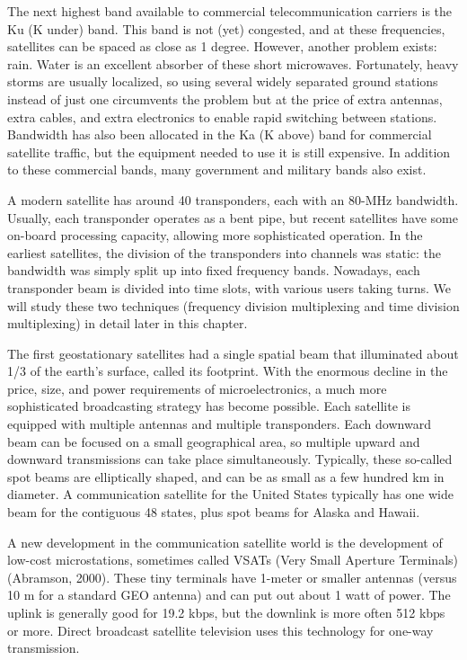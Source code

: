 The next highest band available to commercial telecommunication carriers
is the Ku (K under) band. This band is not (yet) congested, and at these
frequencies, satellites can be spaced as close as 1 degree. However,
another problem exists: rain. Water is an excellent absorber of these
short microwaves. Fortunately, heavy storms are usually localized, so
using several widely separated ground stations instead of just one
circumvents the problem but at the price of extra antennas, extra
cables, and extra electronics to enable rapid switching between
stations. Bandwidth has also been allocated in the Ka (K above) band for
commercial satellite traffic, but the equipment needed to use it is
still expensive. In addition to these commercial bands, many government
and military bands also exist.

A modern satellite has around 40 transponders, each with an 80-MHz
bandwidth. Usually, each transponder operates as a bent pipe, but recent
satellites have some on-board processing capacity, allowing more
sophisticated operation. In the earliest satellites, the division of the
transponders into channels was static: the bandwidth was simply split up
into fixed frequency bands. Nowadays, each transponder beam is divided
into time slots, with various users taking turns. We will study these
two techniques (frequency division multiplexing and time division
multiplexing) in detail later in this chapter.

The first geostationary satellites had a single spatial beam that
illuminated about 1/3 of the earth's surface, called its {footprint}.
With the enormous decline in the price, size, and power requirements of
microelectronics, a much more sophisticated broadcasting strategy has
become possible. Each satellite is equipped with multiple antennas and
multiple transponders. Each downward beam can be focused on a small
geographical area, so multiple upward and downward transmissions can
take place simultaneously. Typically, these so-called {spot beams} are
elliptically shaped, and can be as small as a few hundred km in
diameter. A communication satellite for the United States typically has
one wide beam for the contiguous 48 states, plus spot beams for Alaska
and Hawaii.

A new development in the communication satellite world is the
development of low-cost microstations, sometimes called {VSATs} ({Very
Small Aperture Terminals}) (Abramson, 2000). These tiny terminals have
1-meter or smaller antennas (versus 10 m for a standard GEO antenna) and
can put out about 1 watt of power. The uplink is generally good for 19.2
kbps, but the downlink is more often 512 kbps or more. Direct broadcast
satellite television uses this technology for one-way transmission.

